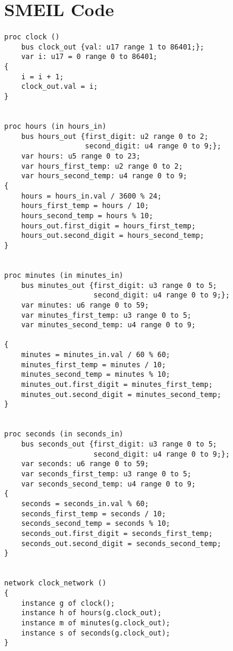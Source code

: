 \section*{SMEIL Code}
\begin{verbatim}
proc clock ()
    bus clock_out {val: u17 range 1 to 86401;};
    var i: u17 = 0 range 0 to 86401;
{
    i = i + 1;
    clock_out.val = i;
}


proc hours (in hours_in)
    bus hours_out {first_digit: u2 range 0 to 2;
                   second_digit: u4 range 0 to 9;};
    var hours: u5 range 0 to 23;
    var hours_first_temp: u2 range 0 to 2;
    var hours_second_temp: u4 range 0 to 9;
{
    hours = hours_in.val / 3600 % 24;
    hours_first_temp = hours / 10;
    hours_second_temp = hours % 10;
    hours_out.first_digit = hours_first_temp;
    hours_out.second_digit = hours_second_temp;
}


proc minutes (in minutes_in)
    bus minutes_out {first_digit: u3 range 0 to 5;
                     second_digit: u4 range 0 to 9;};
    var minutes: u6 range 0 to 59;
    var minutes_first_temp: u3 range 0 to 5;
    var minutes_second_temp: u4 range 0 to 9;

{
    minutes = minutes_in.val / 60 % 60;
    minutes_first_temp = minutes / 10;
    minutes_second_temp = minutes % 10;
    minutes_out.first_digit = minutes_first_temp;
    minutes_out.second_digit = minutes_second_temp;
}


proc seconds (in seconds_in)
    bus seconds_out {first_digit: u3 range 0 to 5;
                     second_digit: u4 range 0 to 9;};
    var seconds: u6 range 0 to 59;
    var seconds_first_temp: u3 range 0 to 5;
    var seconds_second_temp: u4 range 0 to 9;
{
    seconds = seconds_in.val % 60;
    seconds_first_temp = seconds / 10;
    seconds_second_temp = seconds % 10;
    seconds_out.first_digit = seconds_first_temp;
    seconds_out.second_digit = seconds_second_temp;
}


network clock_network ()
{
    instance g of clock();
    instance h of hours(g.clock_out);
    instance m of minutes(g.clock_out);
    instance s of seconds(g.clock_out);
}

\end{verbatim}

